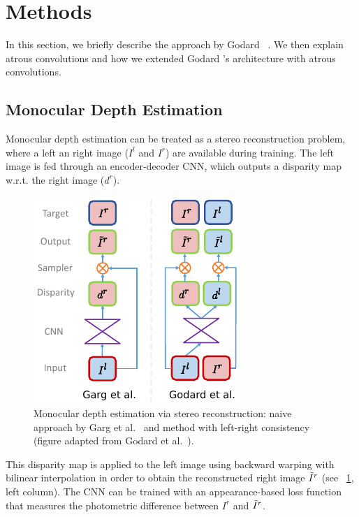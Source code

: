\section{Methods}
\label{sec:methods}
In this section, we briefly describe the approach by Godard \etal~\cite{Godard_2017_CVPR}.
We then explain atrous convolutions and how we extended Godard \etal's architecture with atrous convolutions.

\subsection{Monocular Depth Estimation}
\label{sec:methods:depth-estimation}
Monocular depth estimation can be treated as a stereo reconstruction problem, where a left an right image ($I^l$ and $I^r$) are available during training.
The left image is fed through an encoder-decoder CNN, which outputs a disparity map w.r.t. the right image ($d^r$).
\begin{figure}
    \centering
    \includegraphics[width=0.8\linewidth]{images/architecture/monodepth.pdf}
    \caption{Monocular depth estimation via stereo reconstruction: naive approach by Garg et al.~\cite{garg2016unsupervised} and method with left-right consistency (figure adapted from Godard et al.~\cite{Godard_2017_CVPR}).}
    \label{fig:monodepth}
\end{figure}
This disparity map is applied to the left image using backward warping with bilinear interpolation in order to obtain the reconstructed right image $\Tilde{I}^r$ (see \figurename~\ref{fig:monodepth}, left column).
The CNN can be trained with an appearance-based loss function that measures the photometric difference between $I^r$ and $\Tilde{I}^r$.

